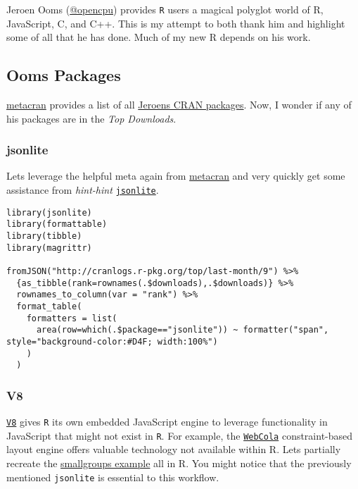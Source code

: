 Jeroen Ooms (\href{https://jeroenooms.github.io/}{@opencpu}) provides \texttt{R}
users a magical polyglot world of R, JavaScript, C, and C++. This is my
attempt to both thank him and highlight some of all that he has done.
Much of my new R depends on his work.

\subsection{Ooms\textquotesingle{} Packages}

\href{http://www.r-pkg.org/}{metacran} provides a list of all \href{http://www.r-pkg.org/maint/jeroen.ooms@stat.ucla.edu}{Jeroen\textquotesingle{}s CRAN
packages}. Now, I
wonder if any of his packages are in the \emph{Top Downloads}.

\subsubsection{jsonlite}

Let\textquotesingle{}s leverage the helpful meta again from
\href{http://www.r-pkg.org/}{metacran} and very quickly get some assistance
from \emph{hint-hint}
\href{https://cran.r-project.org/web/packages/jsonlite/index.html}{\texttt{jsonlite}}.

\begin{verbatim}
library(jsonlite)
library(formattable)
library(tibble)
library(magrittr)

fromJSON("http://cranlogs.r-pkg.org/top/last-month/9") %>%
  {as_tibble(rank=rownames(.$downloads),.$downloads)} %>%
  rownames_to_column(var = "rank") %>%
  format_table(
    formatters = list(
      area(row=which(.$package=="jsonlite")) ~ formatter("span", style="background-color:#D4F; width:100%")
    )
  )
\end{verbatim}

\subsubsection{V8}

\href{https://github.com/jeroenooms/V8}{\texttt{V8}} gives \texttt{R} its own embedded
JavaScript engine to leverage functionality in JavaScript that might not
exist in \texttt{R}. For example, the
\href{http://marvl.infotech.monash.edu/webcola}{\texttt{WebCola}} constraint-based
layout engine offers valuable technology not available within R. Let\textquotesingle{}s
partially recreate the \href{http://marvl.infotech.monash.edu/webcola/examples/smallgroups.html}{smallgroups
example}
all in R. You might notice that the previously mentioned \texttt{jsonlite} is
essential to this workflow.

